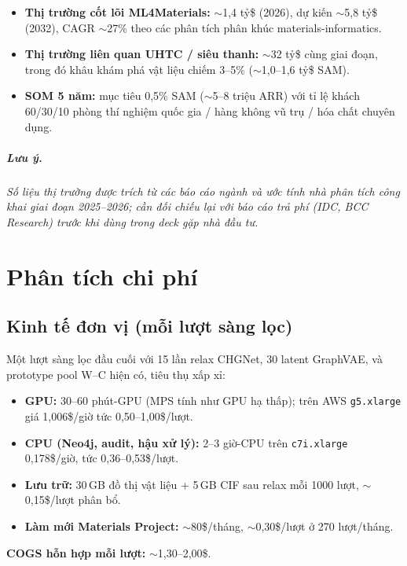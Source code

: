 \documentclass[11pt,a4paper]{report}
\begin{document}
\begin{itemize}[leftmargin=*,itemsep=2pt]
\item \textbf{Thị trường cốt lõi ML4Materials:} $\sim$1{,}4 tỷ\$ (2026), dự kiến
      $\sim$5{,}8 tỷ\$ (2032), CAGR $\sim$27\% theo các phân tích phân khúc
      materials-informatics.
\item \textbf{Thị trường liên quan UHTC / siêu thanh:} $\sim$32 tỷ\$ cùng giai đoạn, trong
      đó khâu khám phá vật liệu chiếm 3--5\% ($\sim$1{,}0--1{,}6 tỷ\$ SAM).
\item \textbf{SOM 5 năm:} mục tiêu 0{,}5\% SAM ($\sim$5--8 triệu ARR) với tỉ lệ khách
      60/30/10 phòng thí nghiệm quốc gia / hàng không vũ trụ / hóa chất chuyên dụng.
\end{itemize}

\paragraph{Lưu ý.}
\textit{Số liệu thị trường được trích từ các báo cáo ngành và ước tính nhà phân tích công
khai giai đoạn 2025--2026; cần đối chiếu lại với báo cáo trả phí (IDC, BCC Research) trước
khi dùng trong deck gặp nhà đầu tư.}

\chapter{Phân tích chi phí}

\section{Kinh tế đơn vị (mỗi lượt sàng lọc)}

Một lượt sàng lọc đầu cuối với 15 lần relax CHGNet, 30 latent GraphVAE, và prototype pool
W--C hiện có, tiêu thụ xấp xỉ:
\begin{itemize}[leftmargin=*,itemsep=2pt]
\item \textbf{GPU:} 30--60 phút-GPU (MPS tính như GPU hạ thấp); trên AWS \texttt{g5.xlarge}
      giá 1{,}006\$/giờ tức 0{,}50--1{,}00\$/lượt.
\item \textbf{CPU (Neo4j, audit, hậu xử lý):} 2--3 giờ-CPU trên \texttt{c7i.xlarge}
      0{,}178\$/giờ, tức 0{,}36--0{,}53\$/lượt.
\item \textbf{Lưu trữ:} 30\,GB đồ thị vật liệu + 5\,GB CIF sau relax mỗi 1000 lượt,
      $\sim$0{,}15\$/lượt phân bổ.
\item \textbf{Làm mới Materials Project:} $\sim$80\$/tháng, $\sim$0{,}30\$/lượt ở 270 lượt/tháng.
\end{itemize}
\textbf{COGS hỗn hợp mỗi lượt:} $\sim$1{,}30--2{,}00\$.
\end{document}
